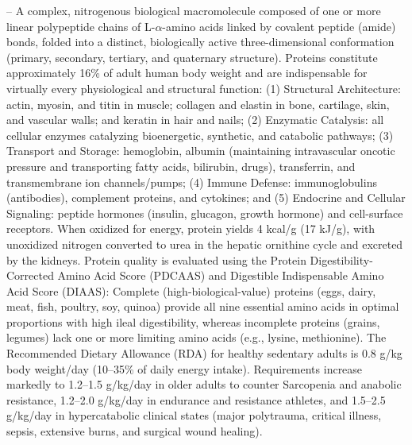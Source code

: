 -- A complex, nitrogenous biological macromolecule composed of one or more linear polypeptide chains of L-$\alpha$-amino acids linked by covalent peptide (amide) bonds, folded into a distinct, biologically active three-dimensional conformation (primary, secondary, tertiary, and quaternary structure). Proteins constitute approximately 16\% of adult human body weight and are indispensable for virtually every physiological and structural function: (1) Structural Architecture: actin, myosin, and titin in muscle; collagen and elastin in bone, cartilage, skin, and vascular walls; and keratin in hair and nails; (2) Enzymatic Catalysis: all cellular enzymes catalyzing bioenergetic, synthetic, and catabolic pathways; (3) Transport and Storage: hemoglobin, albumin (maintaining intravascular oncotic pressure and transporting fatty acids, bilirubin, drugs), transferrin, and transmembrane ion channels/pumps; (4) Immune Defense: immunoglobulins (antibodies), complement proteins, and cytokines; and (5) Endocrine and Cellular Signaling: peptide hormones (insulin, glucagon, growth hormone) and cell-surface receptors. When oxidized for energy, protein yields 4 kcal/g (17 kJ/g), with unoxidized nitrogen converted to urea in the hepatic ornithine cycle and excreted by the kidneys. Protein quality is evaluated using the Protein Digestibility-Corrected Amino Acid Score (PDCAAS) and Digestible Indispensable Amino Acid Score (DIAAS): Complete (high-biological-value) proteins (eggs, dairy, meat, fish, poultry, soy, quinoa) provide all nine essential amino acids in optimal proportions with high ileal digestibility, whereas incomplete proteins (grains, legumes) lack one or more limiting amino acids (e.g., lysine, methionine). The Recommended Dietary Allowance (RDA) for healthy sedentary adults is 0.8 g/kg body weight/day (10--35\% of daily energy intake). Requirements increase markedly to 1.2--1.5 g/kg/day in older adults to counter Sarcopenia and anabolic resistance, 1.2--2.0 g/kg/day in endurance and resistance athletes, and 1.5--2.5 g/kg/day in hypercatabolic clinical states (major polytrauma, critical illness, sepsis, extensive burns, and surgical wound healing).


